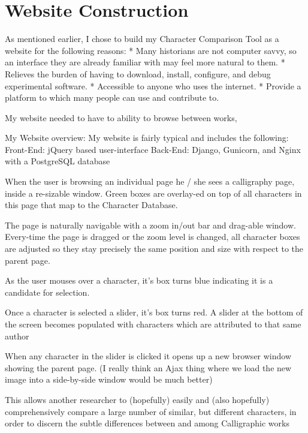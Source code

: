 \chapter{Website Construction}

As mentioned earlier, I chose to build my Character Comparison Tool as a website for the following reasons:
    * Many historians are not computer savvy, so an interface they are already familiar with may feel more natural to them.
    * Relieves the burden of having to download, install, configure, and debug experimental software.
    * Accessible to anyone who uses the internet.
    * Provide  a platform to which many people can use and contribute to.
    
    My website needed to have to ability to browse between works, 
    
        My Website overview:
            My website is fairly typical and includes the following:
                Front-End:  jQuery based user-interface
                Back-End:   Django, Gunicorn, and Nginx with a PostgreSQL database
                
            When the user is browsing an individual page he / she sees a calligraphy page, inside a re-sizable window.
                Green boxes are overlay-ed on top of all characters in this page that map to the Character Database.
                
                The page is naturally navigable with a zoom in/out bar and drag-able window.
                Every-time the page is dragged or the zoom level is changed, all character boxes are adjusted so they stay precisely the same position and size with respect to the parent page.
                
                As the user mouses over a character, it's box turns blue indicating it is a candidate for selection.
                
                Once a character is selected a slider, it's box turns red. A slider at the bottom of the screen becomes populated with characters which are attributed to that same author
                
                When any character in the slider is clicked it opens up a new browser window showing the parent page.  (I really think an Ajax thing where we load the new image into a side-by-side window would be much better)
                
                This allows another researcher to (hopefully) easily and (also hopefully) comprehensively compare a large number of similar, but different characters, in order to discern the subtle differences between and among Calligraphic works
                
